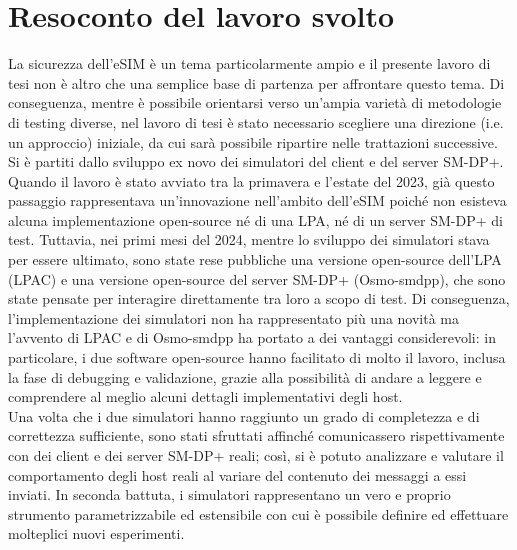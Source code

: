 \documentclass[10pt, oneside]{book}
\begin{document}
\section{Resoconto del lavoro svolto}
La sicurezza dell'eSIM è un tema particolarmente ampio e il presente lavoro di tesi non è altro che una semplice base di partenza per affrontare questo tema. Di conseguenza, mentre è possibile orientarsi verso un'ampia varietà di metodologie di testing diverse, nel lavoro di tesi è stato necessario scegliere una direzione (i.e. un approccio) iniziale, da cui sarà possibile ripartire nelle trattazioni successive.\\
Si è partiti dallo sviluppo ex novo dei simulatori del client e del server SM-DP+. Quando il lavoro è stato avviato tra la primavera e l'estate del 2023, già questo passaggio rappresentava un'innovazione nell'ambito dell'eSIM poiché non esisteva alcuna implementazione open-source né di una LPA, né di un server SM-DP+ di test. Tuttavia, nei primi mesi del 2024, mentre lo sviluppo dei simulatori stava per essere ultimato, sono state rese pubbliche una versione open-source dell'LPA (LPAC) e una versione open-source del server SM-DP+ (Osmo-smdpp), che sono state pensate per interagire direttamente tra loro a scopo di test. Di conseguenza, l'implementazione dei simulatori non ha rappresentato più una novità ma l'avvento di LPAC e di Osmo-smdpp ha portato a dei vantaggi considerevoli: in particolare, i due software open-source hanno facilitato di molto il lavoro, inclusa la fase di debugging e validazione, grazie alla possibilità di andare a leggere e comprendere al meglio alcuni dettagli implementativi degli host.\\
Una volta che i due simulatori hanno raggiunto un grado di completezza e di correttezza sufficiente, sono stati sfruttati affinché comunicassero rispettivamente con dei client e dei server SM-DP+ reali; così, si è potuto analizzare e valutare il comportamento degli host reali al variare del contenuto dei messaggi a essi inviati. In seconda battuta, i simulatori rappresentano un vero e proprio strumento parametrizzabile ed estensibile con cui è possibile definire ed effettuare molteplici nuovi esperimenti.
\end{document}

